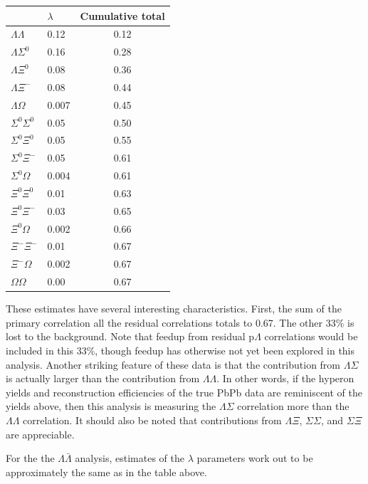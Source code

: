 \begin{center}
\begin{tabular}{|l|l|c|}
\hline
					& 	$\lambda$	&	Cumulative total \\ \hline
$\Lambda\Lambda$   	&	0.12			&	0.12 \\ \hline
$\Lambda\Sigma^0$  	&	0.16			&	0.28 \\ \hline
$\Lambda\Xi^0$     	&	0.08			&	0.36 \\ \hline
$\Lambda\Xi^-$     	&	0.08			&	0.44 \\ \hline
$\Lambda\Omega$    	&	0.007		&	0.45 \\ \hline
$\Sigma^0\Sigma^0$ 	&	0.05			&	0.50 \\ \hline
$\Sigma^0\Xi^0$    	&	0.05			&	0.55 \\ \hline
$\Sigma^0\Xi^-$    	&	0.05			&	0.61 \\ \hline
$\Sigma^0\Omega$   	&	0.004		&	0.61 \\ \hline
$\Xi^0\Xi^0$       	&	0.01			&	0.63 \\ \hline
$\Xi^0\Xi^-$ 		&	0.03			&	0.65 \\ \hline
$\Xi^0\Omega$ 		&	0.002		&	0.66 \\ \hline
$\Xi^-\Xi^-$ 		&	0.01			&	0.67 \\ \hline
$\Xi^-\Omega$ 		&	0.002		&	0.67 \\ \hline
$\Omega\Omega$ 		&	0.00			&	0.67 \\ \hline
\end{tabular}
\end{center}

These estimates have several interesting characteristics.  First, the sum of the primary correlation all the residual correlations totals to 0.67.  The other 33\% is lost to the background.  Note that feedup from residual p$\Lambda$ correlations would be included in this 33\%, though feedup has otherwise not yet been explored in this analysis. Another striking feature of these data is that the contribution from $\Lambda\Sigma$ is actually larger than the contribution from $\Lambda\Lambda$.  In other words, if the hyperon yields and reconstruction efficiencies of the true PbPb data are reminiscent of the yields above, then this analysis is measuring the $\Lambda\Sigma$ correlation more than the $\Lambda\Lambda$ correlation.  It should also be noted that contributions from $\Lambda\Xi$, $\Sigma\Sigma$, and $\Sigma\Xi$ are appreciable.

For the the $\Lambda\bar{\Lambda}$ analysis, estimates of the $\lambda$ parameters work out to be approximately the same as in the table above.

